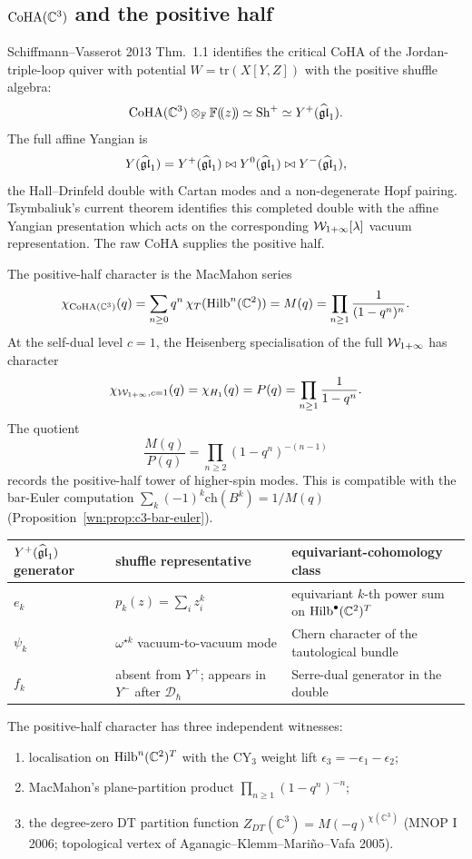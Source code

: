 \subsection*{$\mathrm{CoHA}(\mathbb C^3)$ and the positive half}

Schiffmann--Vasserot 2013 Thm.\ 1.1 identifies the critical CoHA of the
Jordan-triple-loop quiver with potential
$W=\mathrm{tr}(X[Y,Z])$ with the positive shuffle algebra:
\[
\mathrm{CoHA}(\mathbb C^3)\otimes_{\mathbb F}\mathbb F(\!(z)\!)
\simeq \mathrm{Sh}^+ \simeq Y^+(\widehat{\mathfrak{gl}}_1).
\]
The full affine Yangian is
\[
Y(\widehat{\mathfrak{gl}}_1)=Y^+(\widehat{\mathfrak{gl}}_1)\bowtie Y^0(\widehat{\mathfrak{gl}}_1)\bowtie Y^-(\widehat{\mathfrak{gl}}_1),
\]
the Hall--Drinfeld double with Cartan modes and a non-degenerate Hopf
pairing. Tsymbaliuk's current theorem identifies this completed double
with the affine Yangian presentation which acts on the corresponding
$\mathcal{W}_{1+\infty}[\lambda]$ vacuum representation. The raw CoHA supplies the
positive half.

The positive-half character is the MacMahon series
\[
\chi_{\mathrm{CoHA}(\mathbb C^3)}(q)
  = \sum_{n\ge0}q^n\,\chi_T(\mathrm{Hilb}^n(\mathbb C^2))
  = M(q)
  = \prod_{n\ge1}\frac{1}{(1-q^n)^n}.
\]
At the self-dual level $c=1$, the Heisenberg specialisation of the full
$\mathcal{W}_{1+\infty}$ has character
\[
\chi_{\mathcal{W}_{1+\infty},c=1}(q)
  = \chi_{H_1}(q)
  = P(q)
  = \prod_{n\ge1}\frac{1}{1-q^n}.
\]
The quotient
\[
\frac{M(q)}{P(q)}=\prod_{n\ge2}(1-q^n)^{-(n-1)}
\]
records the positive-half tower of higher-spin modes. This is compatible
with the bar-Euler computation
$\sum_k(-1)^k\mathrm{ch}(B^k)=1/M(q)$
(Proposition~\ref{wn:prop:c3-bar-euler}).

\begin{center}
\renewcommand{\arraystretch}{1.15}
\begin{tabular}{lll}
\toprule
$Y^+(\widehat{\mathfrak{gl}}_1)$ generator & shuffle representative &
equivariant-cohomology class \\
\midrule
$e_k$ & $p_k(z)=\sum_i z_i^k$
  & equivariant $k$-th power sum on $\mathrm{Hilb}^\bullet(\mathbb C^2)^T$ \\
$\psi_k$ & $\omega^{\star k}$ vacuum-to-vacuum mode
  & Chern character of the tautological bundle \\
$f_k$ & absent from $Y^+$; appears in $Y^-$ after $\mathcal D_\hbar$
  & Serre-dual generator in the double \\
\bottomrule
\end{tabular}
\end{center}

The positive-half character has three independent witnesses:
\begin{enumerate}
\item localisation on $\mathrm{Hilb}^n(\mathbb C^2)^T$ with the CY$_3$ weight
    lift $\epsilon_3=-\epsilon_1-\epsilon_2$;
\item MacMahon's plane-partition product
    $\prod_{n\ge1}(1-q^n)^{-n}$;
\item the degree-zero DT partition function
    $Z_{DT}(\mathbb C^3)=M(-q)^{\chi(\mathbb C^3)}$
    (MNOP I 2006; topological vertex of Aganagic--Klemm--Mariño--Vafa
    2005).
\end{enumerate}

